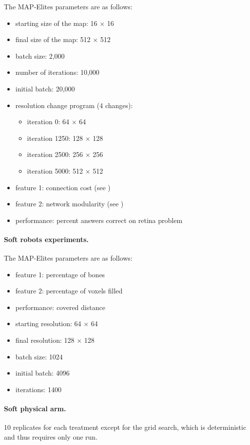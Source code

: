 \documentclass[twocolumn, DIV25, 9pt]{scrartcl}
\begin{document}
The MAP-Elites parameters are as follows:
\begin{itemize}
\item starting size of the map: 16 $\times$ 16
\item final size of the map: 512 $\times$ 512
\item batch size: 2,000
\item number of iterations: 10,000
\item initial batch: 20,000
\item resolution change program (4 changes):
\begin{itemize} %
\item iteration 0: 64 $\times$ 64
\item iteration 1250: 128 $\times$ 128
\item iteration 2500: 256 $\times$ 256
\item iteration 5000: 512 $\times$ 512
\end{itemize}
\item feature 1: connection cost (see \cite{clune2013originModularity})
\item feature 2: network modularity (see \cite{clune2013originModularity})
\item performance: percent answers correct on retina problem\cite{clune2013originModularity}
\end{itemize}

\paragraph{Soft robots experiments.}

The MAP-Elites parameters are as follows:
\begin{itemize}
\item feature 1: percentage of bones
\item feature 2: percentage of voxels filled
\item performance: covered distance
\item starting resolution: 64 $\times$ 64
\item final resolution: 128 $\times$ 128
\item batch size: 1024
\item initial batch: 4096
\item iterations: 1400 %
\end{itemize}


\paragraph{Soft physical arm.}
10 replicates for each treatment except for the grid search, which is deterministic and thus requires only one run.
\end{document}
